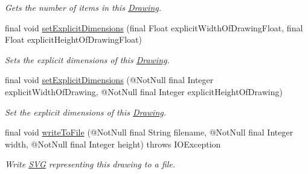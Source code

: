 \begin{DoxyCompactItemize}
\begin{DoxyCompactList}\small\item\em Gets the number of items in this \hyperlink{classcom_1_1aarrelaakso_1_1drawl_1_1_drawing}{Drawing}. \end{DoxyCompactList}\item 
final void \hyperlink{classcom_1_1aarrelaakso_1_1drawl_1_1_drawing_a4ac8a97ae89af08cf9ab01dbbe3dc010}{set\+Explicit\+Dimensions} (final Float explicit\+Width\+Of\+Drawing\+Float, final Float explicit\+Height\+Of\+Drawing\+Float)
\begin{DoxyCompactList}\small\item\em Sets the explicit dimensions of this \hyperlink{classcom_1_1aarrelaakso_1_1drawl_1_1_drawing}{Drawing}. \end{DoxyCompactList}\item 
final void \hyperlink{classcom_1_1aarrelaakso_1_1drawl_1_1_drawing_a79952c781df3b19936f0f47e2810951d}{set\+Explicit\+Dimensions} (@Not\+Null final Integer explicit\+Width\+Of\+Drawing, @Not\+Null final Integer explicit\+Height\+Of\+Drawing)
\begin{DoxyCompactList}\small\item\em Set the explicit dimensions of this \hyperlink{classcom_1_1aarrelaakso_1_1drawl_1_1_drawing}{Drawing}. \end{DoxyCompactList}\item 
final void \hyperlink{classcom_1_1aarrelaakso_1_1drawl_1_1_drawing_a3cf3359170b92a63cdcb5ab67a18562e}{write\+To\+File} (@Not\+Null final String filename, @Not\+Null final Integer width, @Not\+Null final Integer height)  throws I\+O\+Exception 
\begin{DoxyCompactList}\small\item\em Write \hyperlink{classcom_1_1aarrelaakso_1_1drawl_1_1_s_v_g}{S\+VG} representing this drawing to a file. \end{DoxyCompactList}\end{DoxyCompactItemize}
